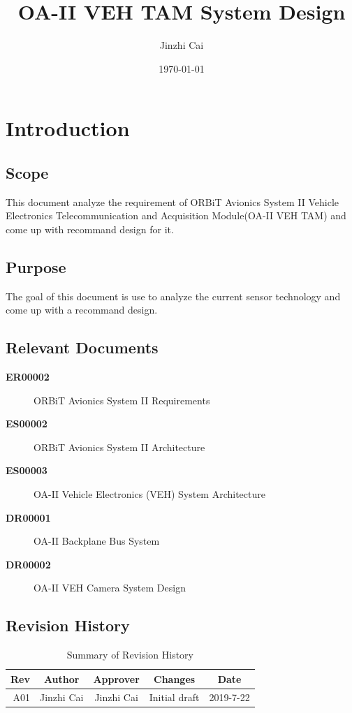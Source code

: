 \documentclass[12pt,article]{memoir}
\title{OA-II VEH TAM System Design}
\author{Jinzhi Cai}
\date{\today}
\begin{document}
	


\tableofcontents*
\clearpage


\chapter{Introduction}
\section{Scope}
This document analyze the requirement of ORBiT Avionics System II Vehicle Electronics Telecommunication and Acquisition Module(OA-II VEH TAM) and come up with recommand design for it.
\section{Purpose}
The goal of this document is use to analyze the current sensor technology and come up with a recommand design.
\section{Relevant Documents}
\begin{description}
	\item[\textbf{ER00002}]ORBiT Avionics System II Requirements
	\item[\textbf{ES00002}]ORBiT Avionics System II Architecture
	\item[\textbf{ES00003}]OA-II Vehicle Electronics (VEH) System Architecture
	\item[\textbf{DR00001}]OA-II Backplane Bus System
	\item[\textbf{DR00002}]OA-II VEH Camera System Design
\end{description}
\section{Revision History}
\begin{table}[H]
	\centering
	\begin{tabu}{r || c | c | c | c }
		Rev & Author & Approver & Changes & Date\\ \hline
		A01 & Jinzhi Cai & Jinzhi Cai & Initial draft & 2019-7-22 \\
	\end{tabu}
	\caption{Summary of Revision History}
	\label{tab:rev}
\end{table}
\newpage
\end{document}
